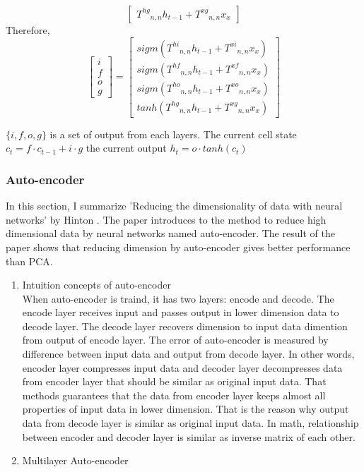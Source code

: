 \documentclass[12pt]{article}
\begin{document}
\begin{enumerate}
\begin{enumerate}
\[\begin{bmatrix}
    {T^{hg}}_{n,n}h_{t-1} + {T^{xg}}_{n,n}x_{x}
\end{bmatrix}
\]
Therefore,\\
\[
\begin{bmatrix}
    i \\
    f \\
    o \\
    g
\end{bmatrix}
=
\begin{bmatrix}
    sigm({T^{hi}}_{n,n}h_{t-1} + {T^{xi}}_{n,n}x_{x}) \\
    sigm({T^{hf}}_{n,n}h_{t-1} + {T^{xf}}_{n,n}x_{x}) \\
    sigm({T^{ho}}_{n,n}h_{t-1} + {T^{xo}}_{n,n}x_{x}) \\
    tanh({T^{hg}}_{n,n}h_{t-1} + {T^{xg}}_{n,n}x_{x})
\end{bmatrix}
\]

$\{i, f, o, g\}$ is a set of output from each layers.
The current cell state $c_t = f \cdot c_{t-1} + i \cdot g$
the current output $h_t = o \cdot tanh(c_t)$

	\end{enumerate}
\end{enumerate}

\subsubsection{Auto-encoder}
In this section, I summarize 'Reducing the dimensionality of data with neural networks' by Hinton \cite{hinton2006reducing}. The paper introduces to the method to reduce high dimensional data by neural networks named auto-encoder. The result of the paper shows that reducing dimension by auto-encoder gives better performance than PCA. \\
\begin{enumerate}
\item Intuition concepts of auto-encoder\\
When auto-encoder is traind, it has two layers: encode and decode. The encode layer receives input and passes output in lower dimension data to decode layer. The decode layer recovers dimension to input data dimention from output of encode layer. The error of auto-encoder is measured by difference between input data and output from decode layer. In other words, encoder layer compresses input data and decoder layer decompresses data from encoder layer that should be similar as original input data. That methods guarantees that the data from encoder layer keeps almost all properties of input data in lower dimension. That is the reason why output data from decode layer is similar as original input data. In math, relationship between encoder and decoder layer is similar as inverse matrix of each other.

\item Multilayer Auto-encoder\\

\end{enumerate}
\end{document}

